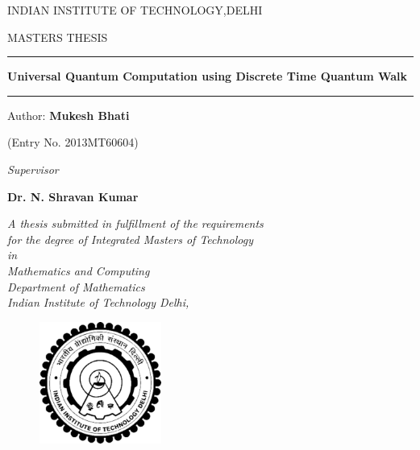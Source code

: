 \documentclass[11 pt]{article}
\theoremstyle{definition}
\theoremstyle{remark}
\begin{document}
\begin{center}
\begin{large}
 {INDIAN INSTITUTE OF TECHNOLOGY,DELHI}
\end{large}

\vspace{10 mm}
{\begin{normalsize}
{MASTERS THESIS}
\end{normalsize}}
\vspace{3 mm}
\hrule
\vspace{4 mm}
\begin{Large}
\textbf {Universal Quantum Computation using Discrete Time Quantum Walk }
\end{Large}
\vspace{4 mm}
\hrule
\end{center}

\vspace{10mm}
\begin{center}
Author:
\textbf{Mukesh Bhati}

(Entry No. 2013MT60604)
\vspace{10mm}

\textit{Supervisor}

\textbf{Dr. N. Shravan Kumar}

\end{center}
\vspace{5 mm}

\begin{center}
\textit{A thesis submitted in fulfillment of the requirements\\ for the degree of Integrated Masters of Technology\\}
\vspace{2 mm}
\textit{in\\}
\vspace{2 mm}
\textit{{Mathematics and Computing \\Department of Mathematics\\
Indian Institute of Technology Delhi,\\
}}
\end{center}
\begin{center}

\begin{figure}[h]
\centering
\includegraphics[width=4cm]{iitd_logo.png}
\end{figure}

\end{center}
\end{document}

